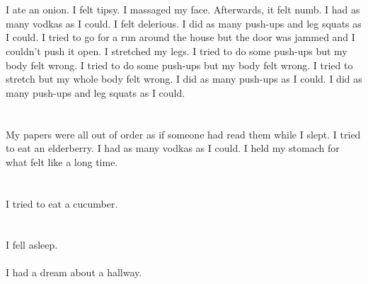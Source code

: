 \documentclass{article}
\begin{document}
    \section{}
    I ate an onion. I felt tipsy. I massaged my face. Afterwards, it felt numb. I had as many vodkas as I could. I felt delerious.  I did as many push-ups and leg squats as I could.  I tried to go for a run around the house but the door was jammed and I couldn't push it open.  I stretched my legs.  I tried to do some push-ups but my body felt wrong.   I tried to do some push-ups but my body felt wrong.  I tried to stretch but my whole body felt wrong.  I did as many push-ups as I could.  I did as many push-ups and leg squats as I could.  
    \newpage
    
    \section{}
    My papers were all out of order as if someone had read them while I slept. I tried to eat an elderberry. I had as many vodkas as I could. I held my stomach for what felt like a long time.  
    \newpage
    
    \section{}
    I tried to eat a cucumber.  
    \newpage
    
    \section{}
    I fell asleep.\\\\I had a dream about a hallway.\\\\ 
    \newpage
    
\end{document}
